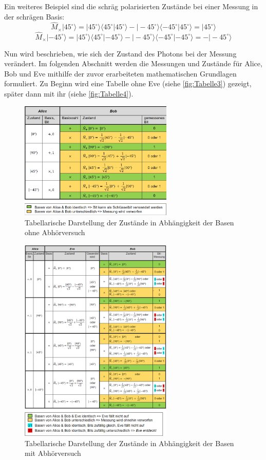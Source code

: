 Ein weiteres Beispiel sind die schräg polarisierten Zustände bei einer Messung in der schrägen Basis:
\[
\hat{M}_\times |45^\circ \rangle = |45^\circ \rangle \langle 45^\circ | 45^\circ \rangle - |-45^\circ \rangle \langle -45^\circ | 45^\circ \rangle = |45^\circ \rangle
\]
\[
\hat{M}_\times |-45^\circ \rangle = |45^\circ \rangle \langle 45^\circ | -45^\circ \rangle - |-45^\circ \rangle \langle -45^\circ | -45^\circ \rangle = -|-45^\circ \rangle
\]

Nun wird beschrieben, wie sich der Zustand des Photons bei der Messung verändert. Im folgenden Abschnitt werden die Messungen und Zustände für Alice, Bob und Eve mithilfe der zuvor erarbeiteten mathematischen Grundlagen formuliert. Zu Beginn wird eine Tabelle ohne Eve (siehe \autoref{fig:Tabelle3}) gezeigt, später dann mit ihr (siehe \autoref{fig:Tabelle4}).


\begin{figure}[H]
	\centering
	\includegraphics[width=0.65\textwidth]{content/grafik/Tabelle3.png}
	\caption{Tabellarische Darstellung der Zustände in Abhängigkeit der Basen ohne Abhörversuch\cite{krypt}}
	\label{fig:Tabelle3}
\end{figure}

\begin{figure}[H]
	\centering
	\includegraphics[width=0.65\textwidth]{content/grafik/Tabelle4.png}
	\caption{Tabellarische Darstellung der Zustände in Abhängigkeit der Basen mit Abhörversuch\cite{krypt}}
	\label{fig:Tabelle3}
\end{figure}